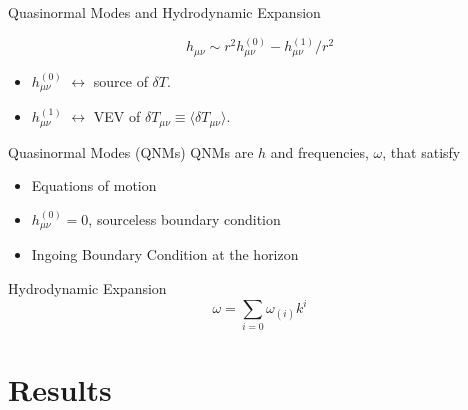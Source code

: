 \documentclass[xcolor=dvipsnames]{beamer}
\begin{document}

\begin{frame}{Quasinormal Modes and Hydrodynamic Expansion}

  \begin{equation*}
    h_{\mu\nu} \sim r^2 h^{\mathrm{(0)}}_{\mu\nu} - h^{\mathrm{(1)}}_{\mu\nu}/r^2
  \end{equation*}

  \begin{itemize}
    \item \(h^{\mathrm{(0)}}_{\mu\nu}\) \(\leftrightarrow\) source of
      \(\delta T\).
    \item \(h^{\mathrm{(1)}}_{\mu\nu}\) \(\leftrightarrow\) VEV of
      \(\delta T_{\mu\nu} \equiv \langle \delta T_{\mu\nu} \rangle\).
  \end{itemize}

  \vfill


  \begin{block}{Quasinormal Modes (QNMs)}
    QNMs are $h$ and frequencies, $\omega$, that satisfy
    \begin{itemize}
      \item Equations of motion
      \item \(h^{\mathrm{(0)}}_{\mu\nu} = 0\), sourceless boundary condition
      \item Ingoing Boundary Condition at the horizon
    \end{itemize}
  \end{block}

  \vfill

  \begin{block}{Hydrodynamic Expansion}
    $$\omega = \sum_{i=0} \omega_{(i)} k^i$$
  \end{block}

\end{frame}


\section{Results}
\end{document}
